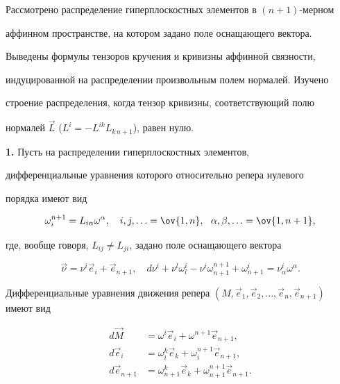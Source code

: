 \label{begin} 


 


 


Рассмотрено распределение гиперплоскостных элементов в $(n+1)$-мерном 


аффинном пространстве, на котором задано поле оснащающего вектора. 


Выведены формулы тензоров кручения и кривизны аффинной связности, 


индуцированной на распределении произвольным полем нормалей. Изучено 


строение распределения, когда тензор кривизны, соответствующий полю 


нормалей $\Vec L$ ($L^i=-L^{i k}L_{k\,n+1}$), равен нулю. 


\medskip 


 


{\bf 1.} Пусть на распределении гиперплоскостных элементов, 


дифференциальные уравнения которого относительно репера нулевого 


порядка имеют вид 


$$ 


\omega^{n+1}_i=L_{i\alpha}\omega^\alpha,\quad 


i,j,\dotsc=\ov{1,n},\ \ \alpha,\beta,\dotsc=\ov{1,n+1}, 


$$ 


где, вообще говоря, $L_{i j}\ne L_{j i}$, задано поле оснащающего вектора 


$$ 


\Vec \nu=\nu^i\Vec e_i+\Vec e_{n+1},\quad 


d\nu^i+\nu^l\omega^i_l-\nu^i\omega^{n+1}_{n+1} 


+\omega^i_{n+1}=\nu^i_\alpha \omega^\alpha. 


$$ 


Дифференциальные уравнения движения репера $(M,\Vec e_1,\Vec 


e_2,\dotsc,\Vec e_n,\Vec e_{n+1})$ имеют вид 


\begin{align*} 


d\Vec M&=\omega^i\Vec e_i+\omega^{n+1}\Vec e_{n+1},\\ 


d\Vec e_i&=\omega^k_i\Vec e_k+\omega^{n+1}_i\Vec e_{n+1},\\ 


d\Vec e_{n+1}&=\omega^k_{n+1}\Vec e_k+ 


\omega^{n+1}_{n+1}\Vec e_{n+1}. 


\end{align*} 


